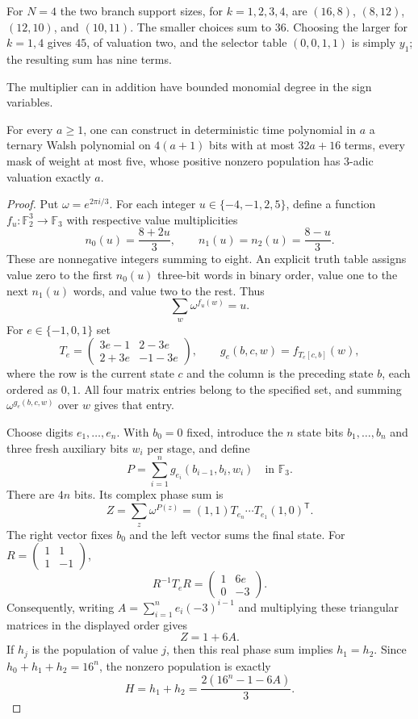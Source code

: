 For $N=4$ the two branch support sizes, for $k=1,2,3,4$, are $(16,8)$, $(8,12)$, $(12,10)$, and $(10,11)$. The smaller choices sum to $36$. Choosing the larger for $k=1,4$ gives $45$, of valuation two, and the selector table $(0,0,1,1)$ is simply $y_1$; the resulting sum has nine terms.


The multiplier can in addition have bounded monomial degree in the sign variables.
\begin{proposition}
\label{st:local-multiplier}
For every $a\ge1$, one can construct in deterministic time polynomial in $a$ a
ternary Walsh polynomial on $4(a+1)$ bits with at most $32a+16$ terms,
every mask of weight at most five, whose positive nonzero population has
$3$-adic valuation exactly $a$.
\end{proposition}
\begin{proof}
Put $\omega=e^{2\pi i/3}$. For each integer
$u\in\{-4,-1,2,5\}$, define a function
$f_u:\mathbb F_2^3\to\mathbb F_3$ with respective value multiplicities
\[
 n_0(u)=\frac{8+2u}{3},\qquad
 n_1(u)=n_2(u)=\frac{8-u}{3}.
\]
These are nonnegative integers summing to eight. An explicit truth table
assigns value zero to the first $n_0(u)$ three-bit words in binary order,
value one to the next $n_1(u)$ words, and value two to the rest. Thus
\[
 \sum_w\omega^{f_u(w)}=u.
\]
For $e\in\{-1,0,1\}$ set
\[
 T_e=\begin{pmatrix}3e-1&2-3e\\2+3e&-1-3e\end{pmatrix},
 \qquad g_e(b,c,w)=f_{T_e[c,b]}(w),
\]
where the row is the current state $c$ and the column is the preceding
state $b$, each ordered as $0,1$. All four matrix entries belong to the
specified set, and summing $\omega^{g_e(b,c,w)}$ over $w$ gives that entry.

Choose digits $e_1,\ldots,e_n$. With $b_0=0$ fixed, introduce the $n$
state bits $b_1,\ldots,b_n$ and three fresh auxiliary bits $w_i$ per stage,
and define
\[
 P=\sum_{i=1}^n g_{e_i}(b_{i-1},b_i,w_i)\quad\text{in }\mathbb F_3.
\]
There are $4n$ bits. Its complex phase sum is
\[
 Z=\sum_z\omega^{P(z)}
   =(1,1)T_{e_n}\cdots T_{e_1}(1,0)^{\mathsf T}.
\]
The right vector fixes $b_0$ and the left vector sums the final state.
For $R=\left(\begin{smallmatrix}1&1\\1&-1\end{smallmatrix}\right)$,
\[
 R^{-1}T_eR=\begin{pmatrix}1&6e\\0&-3\end{pmatrix}.
\]
Consequently, writing $A=\sum_{i=1}^n e_i(-3)^{i-1}$ and multiplying these
triangular matrices in the displayed order gives
\[
 Z=1+6A.
\]
If $h_j$ is the population of value $j$, then this real phase sum implies
$h_1=h_2$. Since $h_0+h_1+h_2=16^n$, the nonzero population is exactly
\begin{equation}
\label{st:eq:local-population}
 H=h_1+h_2=\frac{2(16^n-1-6A)}3.
\end{equation}


\end{proof}
